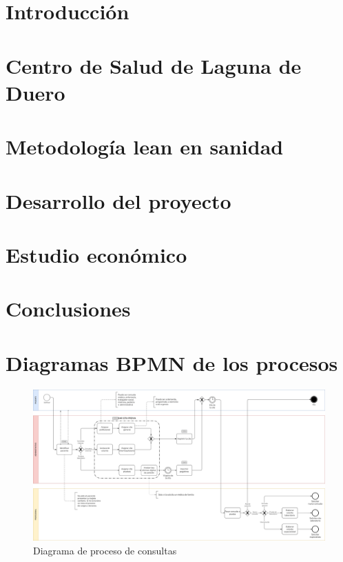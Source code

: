 \documentclass[12pt, a4paper, twoside, openright]{report}
\begin{document}
\tableofcontents

\chapter{Introducción}


\chapter{Centro de Salud de Laguna de Duero}


\chapter{Metodología lean en sanidad}


\chapter{Desarrollo del proyecto}


\chapter{Estudio económico}


\chapter{Conclusiones}


\appendix
\chapter{Diagramas BPMN de los procesos }

\begin{figure}
    \centering
    \begin{sideways}
        \includegraphics[width=0.95\textheight]{img/proceso-consultas.png}
    \end{sideways}
    \caption{Diagrama de proceso de consultas}
    \label{fig:proceso-consultas}
\end{figure}
\end{document}
